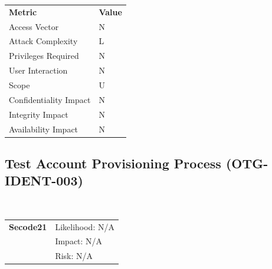 \documentclass[headsepline,footsepline,footinclude=false,oneside,fontsize=11pt,paper=a4,listof=totoc,bibliography=totoc]{scrbook} %
\begin{document}
\begin{center}
	\begin{tabular}{ll}
		\rowcolor[HTML]{34CDF9}
		{\color[HTML]{ECF4FF} \textbf{Metric}}        & {\color[HTML]{ECF4FF} \textbf{Value}} \\
		\rowcolor[HTML]{BBDAFF}
		{\color[HTML]{333333} Access Vector}          & {\color[HTML]{333333} } N              \\
		\rowcolor[HTML]{ECF4FF}
		{\color[HTML]{333333} Attack Complexity}      & {\color[HTML]{333333} } L              \\
		\rowcolor[HTML]{BBDAFF}
		{\color[HTML]{333333} Privileges Required}    & {\color[HTML]{333333} } N              \\
		\rowcolor[HTML]{ECF4FF}
		{\color[HTML]{333333} User Interaction}       & {\color[HTML]{333333} } N              \\
		\rowcolor[HTML]{BBDAFF}
		{\color[HTML]{333333} Scope}                  & {\color[HTML]{333333} } U              \\
		\rowcolor[HTML]{ECF4FF}
		{\color[HTML]{333333} Confidentiality Impact} & {\color[HTML]{333333} } N              \\
		\rowcolor[HTML]{BBDAFF}
		{\color[HTML]{333333} Integrity Impact}       & {\color[HTML]{333333} } N              \\
		\rowcolor[HTML]{ECF4FF}
		{\color[HTML]{333333} Availability Impact}    & {\color[HTML]{333333} } N
	\end{tabular}
\end{center}
\pagebreak

\subsection{Test Account Provisioning Process (OTG-IDENT-003)}\
\begin{tabular}{cR{12cm}}
	\textbf{Secode21} & Likelihood: N/A\\& Impact: N/A\\& Risk: N/A
\end{tabular}
\end{document}
